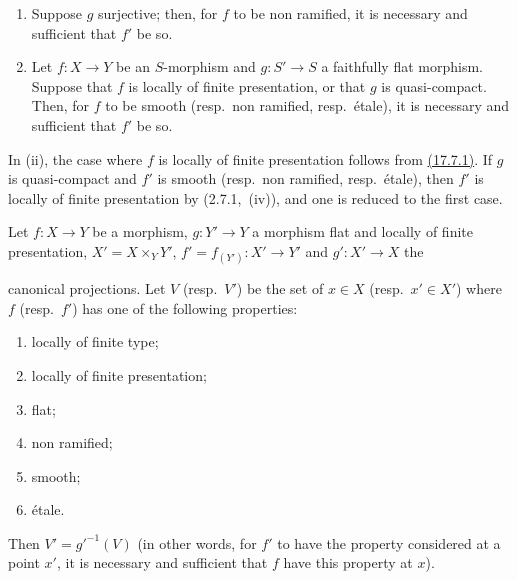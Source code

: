 \begin{corollary}[17.7.3]
\label{IV.17.7.3}
\begin{enumerate}[label=(\roman*)]
  \item Suppose $g$ surjective; then, for $f$ to be non ramified, it is necessary and sufficient that $f'$ be so.
  \item Let $f:X\to Y$ be an $S$-morphism and $g:S'\to S$ a faithfully flat morphism.
  Suppose that $f$ is locally of finite presentation, or that $g$ is quasi-compact.
  Then, for $f$ to be smooth (resp.\ non ramified, resp.\ \'etale), it is necessary and sufficient that $f'$ be so.
\end{enumerate}
\end{corollary}

In (ii), the case where $f$ is locally of finite presentation follows from {\hyperlink{ega4.c04.prop.17-7-1}{(17.7.1)}}.
If $g$ is quasi-compact and $f'$ is smooth (resp.\ non ramified, resp.\ \'etale), then $f'$ is locally of finite presentation by (2.7.1,~(iv)), and one is reduced to the first case.

\begin{proposition}[17.7.4]
\label{IV.17.7.4}
Let $f:X\to Y$ be a morphism, $g:Y'\to Y$ a morphism flat and locally of finite presentation, $X'=X\times_Y Y'$, $f'=f_{(Y')}:X'\to Y'$ and $g':X'\to X$ the


canonical projections. Let $V$ (resp.\ $V'$) be the set of $x\in X$ (resp.\ $x'\in X'$) where $f$ (resp.\ $f'$) has one of the following properties:
\begin{enumerate}[label=(\roman*)]
  \item locally of finite type;
  \item locally of finite presentation;
  \item flat;
  \item non ramified;
  \item smooth;
  \item \'etale.
\end{enumerate}
Then $V'=g'^{-1}(V)$ (in other words, for $f'$ to have the property considered at a point $x'$, it is necessary and sufficient that $f$ have this property at $x$).
\end{proposition}

